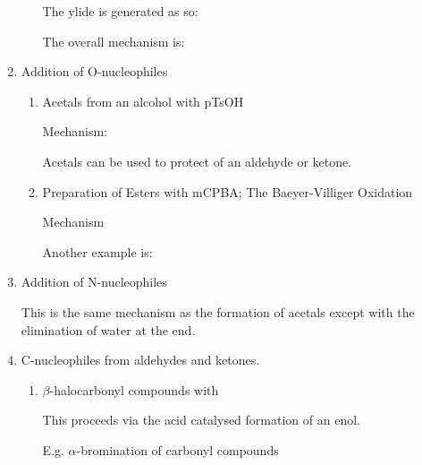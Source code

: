\begin{enumerate}[label=\alph*)]
\begin{enumerate}[label=\roman*)]
        The ylide is generated as so:


        The overall mechanism is:


    \end{enumerate}


  \item Addition of O-nucleophiles

    \begin{enumerate}[label=\roman*)]

      \item Acetals from an alcohol with pTsOH


        Mechanism:


        Acetals can be used to protect  of an aldehyde or ketone.

      \item Preparation of Esters with mCPBA; The Baeyer-Villiger Oxidation


        Mechanism


        Another example is:


    \end{enumerate}

  \item Addition of N-nucleophiles


    This is the same mechanism as the formation of acetals except with the
    elimination of water at the end.

  \item C-nucleophiles from aldehydes and ketones.

    \begin{enumerate}[label=\roman*)]

      \item $\beta$-halocarbonyl compounds with 

        This proceeds via the acid catalysed formation of an enol.


        E.g. $\alpha$-bromination of carbonyl compounds



\end{enumerate}
\end{enumerate}
